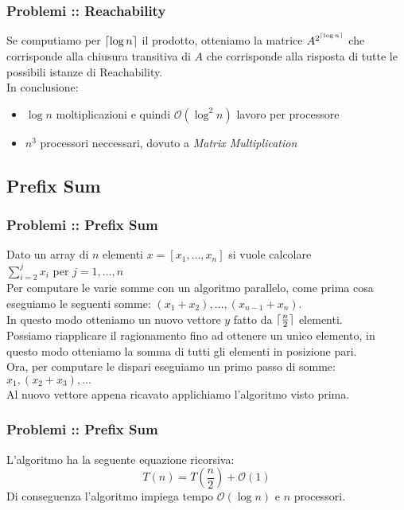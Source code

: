 \documentclass{beamer}
\newcommand{\bigO}{\ensuremath{\mathcal{O}}} %
\DeclarePairedDelimiter{\ceil}{\lceil}{\rceil} %
\begin{document}
\begin{frame}
	\frametitle{Problemi :: Reachability} %

	Se computiamo per $\ceil{\log n}$ il prodotto, otteniamo la matrice $A^{2^{\ceil{\log n}}}$ che corrisponde alla chiusura transitiva di $A$ che corrisponde alla risposta di tutte le possibili istanze di Reachability.\\
	In conclusione:
	\begin{itemize}
		\item $\log n$ moltiplicazioni e quindi $\bigO{(\log^2 n)}$ lavoro per processore
		\item $n^3$ processori neccessari, dovuto a \emph{Matrix Multiplication}
	\end{itemize}
	
\end{frame}

\subsection{Prefix Sum}
\begin{frame}
	\frametitle{Problemi :: Prefix Sum} %
	
	Dato un array di $n$ elementi $x = [x_1,\dots,x_n]$ si vuole calcolare\\ $\sum_{i=2}^{j} x_i$ per $j=1,\dots,n$\\
	Per computare le varie somme con un algoritmo parallelo, come prima cosa eseguiamo le seguenti somme: $(x_1 + x_2),\dots,(x_{n-1} + x_n)$.\\
	In questo modo otteniamo un nuovo vettore $y$ fatto da $\ceil{\frac{n}{2}}$ elementi.\\
	Possiamo riapplicare il ragionamento fino ad ottenere un unico elemento, in questo modo otteniamo la somma di tutti gli elementi in posizione pari.\\
	Ora, per computare le dispari eseguiamo un primo passo di somme: $x_1,(x_2+x_3), \dots$\\
	Al nuovo vettore appena ricavato applichiamo l'algoritmo visto prima.
	
\end{frame}

\begin{frame}
	\frametitle{Problemi :: Prefix Sum} %
	
	
	L'algoritmo ha la seguente equazione ricorsiva:
	\begin{equation}
	T(n) = T\left(\frac{n}{2}\right) + \bigO{(1)}
	\end{equation}
	Di conseguenza l'algoritmo impiega tempo $\bigO{(\log n)}$ e $n$ processori.
	
\end{frame}
\end{document}
